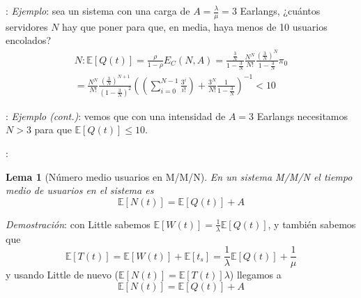 \documentclass[xcolor={x11names}]{beamer}
\newtheorem{lema}{Lema}[section]
\begin{document}
\begin{frame}{\secname: \subsecname}
    \textit{Ejemplo}: sea un sistema con una
    carga de $A=\tfrac{\lambda}{\mu}=3$
    Earlangs, ¿cuántos servidores $N$ hay
    que poner para que, en media,
    haya menos de 10
    usuarios encolados?
    \begin{multline*}
        N:\mathbb{E}[Q(t)]=
        \frac{\rho}{1-\rho}E_C(N,A)
        = \frac{\tfrac{3}{N}}{1-\tfrac{3}{N}}
        \frac{N^N}{N!}\frac{\left(\frac{3}{N}\right)^N}{1-\tfrac{3}{N}}\pi_0\\
        =\frac{N^N}{N!}\frac{\left(\frac{3}{N}\right)^{N+1}}{\left(1-\tfrac{3}{N}\right)^2}
                \left(
                    \left(\sum_{i=0}^{N-1}
                    \frac{3^i}{i!}
                    \right)
                    + \frac{3^N}{N!}\frac{1}{1-\tfrac{3}{N}}
                \right)^{-1}<10
    \end{multline*}
\end{frame}





\begin{frame}{\secname: \subsecname}
    \textit{Ejemplo (cont.)}: vemos que con
    una intensidad de $A=3$ Earlangs necesitamos
    $N>3$ para que $\mathbb{E}[Q(t)]\leq 10$.
    \vfill
    \begin{figure}
        
    \end{figure}
\end{frame}





\begin{frame}{\secname: \subsecname}
    \begin{lema}[Número medio usuarios en M/M/N]
        En un sistema M/M/N el tiempo medio
        de usuarios en el sistema es
        \begin{equation}
            \mathbb{E}[N(t)]=
            \mathbb{E}[Q(t)]+A
        \end{equation}
    \end{lema}
    \vfill
    \textit{Demostración}:
    con Little sabemos
    $\mathbb{E}[W(t)]=\tfrac{1}{\lambda}
    \mathbb{E}[Q(t)]$, y también sabemos que
    \begin{equation*}
        \mathbb{E}[T(t)]
        =\mathbb{E}[W(t)]+\mathbb{E}[t_s]
        = \frac{1}{\lambda}\mathbb{E}[Q(t)]
        + \frac{1}{\mu}
    \end{equation*}
    y usando Little de nuevo
    ($\mathbb{E}[N(t)]=\mathbb{E}[T(t)]\lambda$)
    llegamos a
    \begin{equation*}
        \mathbb{E}[N(t)]=
        \mathbb{E}[Q(t)]+A
    \end{equation*}
\end{frame}
\end{document}
